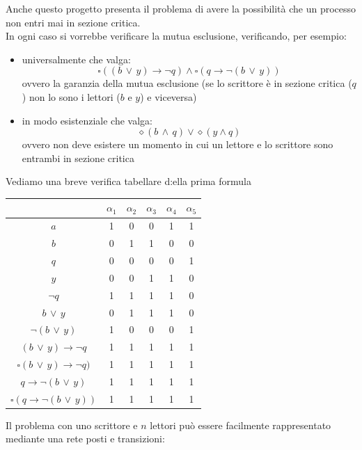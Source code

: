 \documentclass[a4paper,12pt, oneside]{book}
\begin{document}
Anche questo progetto presenta il problema di avere la possibilità che un
processo non entri mai in sezione critica.\\
In ogni caso si vorrebbe verificare la mutua esclusione, verificando, per
esempio: 
\begin{itemize}
  \item universalmente che valga:
  \[\square((b\,\lor\,y)\to \neg q)\land \square(q\to
    \neg(b\,\lor\,y))\]
  ovvero la garanzia della mutua esclusione (se lo scrittore è in sezione
  critica ($q$) non lo sono i lettori ($b$ e $y$) e viceversa)
  \item in modo esistenziale che valga:
  \[\diamond(b\,\land\,q)\lor\diamond(y\land q)\]
  ovvero non deve esistere un momento in cui un lettore e lo scrittore sono
  entrambi in sezione critica
\end{itemize}
\newpage
Vediamo una breve verifica tabellare d:ella prima formula
\begin{center}
  \begin{tabular}{c|c|c|c|c|c}
    & $\alpha_1$ & $\alpha_2$ & $\alpha_3$ & $\alpha_4$ & $\alpha_5$ \\
    \hline
    $a$ & 1 & 0 & 0 & 1 & 1\\
    \hline
    $b$ & 0 & 1 & 1 & 0 & 0\\
    \hline
    $q$ & 0 & 0 & 0 & 0 & 1\\
    \hline
    $y$ & 0 & 0 & 1 & 1 & 0\\
    \hline
    $\neg q$ & 1 & 1 & 1 & 1 & 0\\
    \hline
    $b\,\lor \,y$ & 0 & 1 & 1 & 1 & 0\\
    \hline
    $\neg(b\,\lor \,y)$ & 1 & 0 & 0 & 0 & 1\\
    \hline
    $(b\,\lor\,y)\to \neg q$ & 1 & 1 & 1 & 1 & 1\\
    \hline
    $\square(b\,\lor\,y)\to \neg q)$ & 1 & 1 & 1 & 1 & 1\\
    \hline
    $q\to\neg(b\,\lor\,y)$ & 1 & 1 & 1 & 1 & 1\\
    \hline
    $\square(q\to\neg(b\,\lor\,y))$ & 1 & 1 & 1 & 1 & 1\\                          
  \end{tabular}
\end{center}
Il problema con uno scrittore e $n$ lettori può essere facilmente rappresentato
mediante una rete posti e transizioni:
\end{document}
